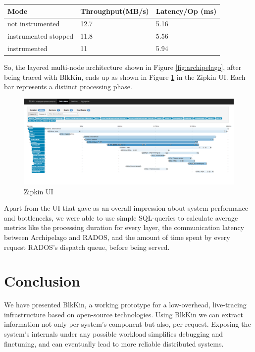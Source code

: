 \documentclass[11pt,journal,compsoc]{IEEEtran}
\begin{document}
\begin{center}
\begin{tabular}{| l | p{3cm} | p{2cm} |}
    \hline
    Mode & Throughput(MB/s) & Latency/Op (ms)  \\ \hline
    not instrumented & 12.7 & 5.16  \\ \hline
    instrumented stopped & 11.8 &  5.56  \\ \hline
    instrumented & 11 & 5.94  \\
    \hline
    \end{tabular}
\end{center}

So, the layered multi-node architecture shown in Figure \ref{fig:archipelago},
after being traced with BlkKin, ends up as shown in Figure \ref{fig:zipkin} in
the Zipkin UI. Each bar represents a distinct processing phase.

\begin{center}
\begin{figure}[h!]
  \centering
  \includegraphics[scale=0.15]{figs/zipkin.png}
  \caption{Zipkin UI}
  \label{fig:zipkin}
\end{figure}
\end{center}
Apart from the UI that gave as an overall impression about system
performance and bottlenecks, we were able to use simple SQL-queries to
calculate average metrics like the processing duration for every layer, the
communication latency between Archipelago and RADOS, and the amount of time
spent by every request RADOS's dispatch queue, before being served.

\section{Conclusion}

We have presented BlkKin, a working prototype for a low-overhead, live-tracing
infrastructure based on open-source technologies. Using BlkKin we can extract
information not only per system's component but also, per request. Exposing the
system's internals under any possible workload simplifies debugging and
finetuning, and can eventually lead to more reliable distributed systems.



\end{document}
